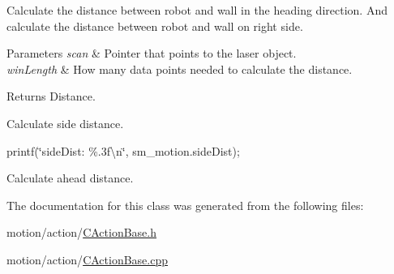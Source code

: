 Calculate the distance between robot and wall in the heading direction. And calculate the distance between robot and wall on right side. 
\begin{DoxyParams}{Parameters}
{\em scan} & Pointer that points to the laser object. \\
\hline
{\em win\+Length} & How many data points needed to calculate the distance. \\
\hline
\end{DoxyParams}
\begin{DoxyReturn}{Returns}
Distance. 
\end{DoxyReturn}
Calculate side distance.

printf(\char`\"{}side\+Dist\+: \%.\+3f\textbackslash{}n\char`\"{}, sm\+\_\+motion.\+side\+Dist);

Calculate ahead distance. 

The documentation for this class was generated from the following files\+:\begin{DoxyCompactItemize}
\item 
motion/action/\mbox{\hyperlink{CActionBase_8h}{C\+Action\+Base.\+h}}\item 
motion/action/\mbox{\hyperlink{CActionBase_8cpp}{C\+Action\+Base.\+cpp}}\end{DoxyCompactItemize}
